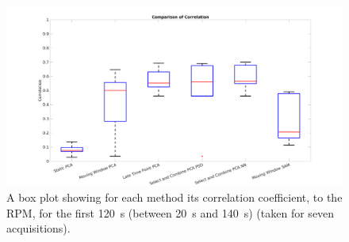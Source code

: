         \begin{figure}
        
        \centering
        
        \includegraphics[width=1.0\linewidth]{figures/box_plot_all.png}
        
        
        \captionsetup{singlelinecheck=false, justification=centering}
        \caption{
        A box plot showing for each method its correlation coefficient, to the \gls{RPM}, for the first \SI{120}{\second} (between \SI{20}{\second} and \SI{140}{\second}) (taken for seven acquisitions).}
        
        \label{fig:box_plot_all}
        
    \end{figure}
    
        
        
        
        
        
